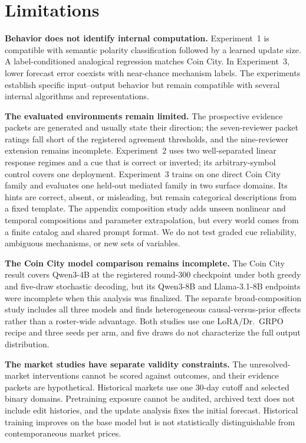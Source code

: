 \section{Limitations}
\label{sec:limitations}

\textbf{Behavior does not identify internal computation.}
Experiment~1 is compatible with semantic polarity classification followed by a
learned update size. A label-conditioned analogical regression matches Coin City.
In Experiment~3, lower forecast error coexists with near-chance mechanism labels.
The experiments establish specific input--output behavior but remain compatible
with several internal algorithms and representations.

\textbf{The evaluated environments remain limited.}
The prospective evidence packets are generated and usually state their direction;
the seven-reviewer packet ratings fall short of the registered agreement thresholds,
and the nine-reviewer extension remains incomplete. Experiment~2 uses two
well-separated linear response regimes and a cue that is correct or inverted; its
arbitrary-symbol control covers one deployment. Experiment~3 trains on one direct
Coin City family and evaluates one held-out mediated family in two surface domains.
Its hints are correct, absent, or misleading, but remain categorical descriptions
from a fixed template. The appendix composition study adds unseen nonlinear and
temporal compositions and parameter extrapolation, but every world comes from a
finite catalog and shared prompt format. We do not test graded cue reliability,
ambiguous mechanisms, or new sets of variables.

\textbf{The Coin City model comparison remains incomplete.}
The Coin City result covers Qwen3-4B at the registered round-300 checkpoint under
both greedy and five-draw stochastic decoding, but its Qwen3-8B and Llama-3.1-8B
endpoints were incomplete when this analysis was finalized. The separate
broad-composition study includes all three models and finds heterogeneous
causal-versus-prior effects rather than a roster-wide advantage. Both studies use
one LoRA/Dr.~GRPO recipe and three seeds per arm, and five draws do not
characterize the full output distribution.

\textbf{The market studies have separate validity constraints.}
The unresolved-market interventions cannot be scored against outcomes, and their
evidence packets are hypothetical. Historical markets use one 30-day cutoff and
selected binary domains. Pretraining exposure cannot be audited, archived text
does not include edit histories, and the update analysis fixes the initial
forecast. Historical training improves on the base model but is not statistically distinguishable
from contemporaneous market prices.
